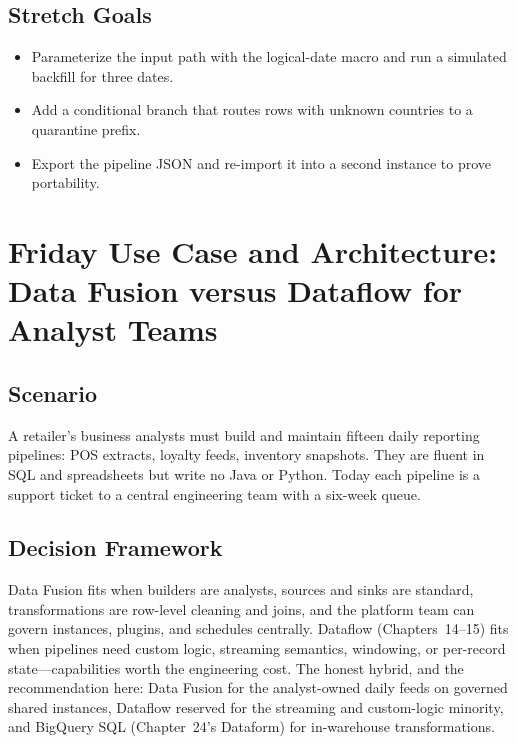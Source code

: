 \subsection*{Stretch Goals}
\begin{itemize}
    \item Parameterize the input path with the logical-date macro and run a simulated backfill for three dates.
    \item Add a conditional branch that routes rows with unknown countries to a quarantine prefix.
    \item Export the pipeline JSON and re-import it into a second instance to prove portability.
\end{itemize}

\section{Friday Use Case and Architecture: Data Fusion versus Dataflow for Analyst Teams}

\subsection{Scenario}
A retailer's business analysts must build and maintain fifteen daily reporting pipelines: POS extracts, loyalty feeds, inventory snapshots. They are fluent in SQL and spreadsheets but write no Java or Python. Today each pipeline is a support ticket to a central engineering team with a six-week queue.

\subsection{Decision Framework}
Data Fusion fits when builders are analysts, sources and sinks are standard, transformations are row-level cleaning and joins, and the platform team can govern instances, plugins, and schedules centrally. Dataflow (Chapters~14--15) fits when pipelines need custom logic, streaming semantics, windowing, or per-record state---capabilities worth the engineering cost. The honest hybrid, and the recommendation here: Data Fusion for the analyst-owned daily feeds on governed shared instances, Dataflow reserved for the streaming and custom-logic minority, and BigQuery SQL (Chapter~24's Dataform) for in-warehouse transformations.

